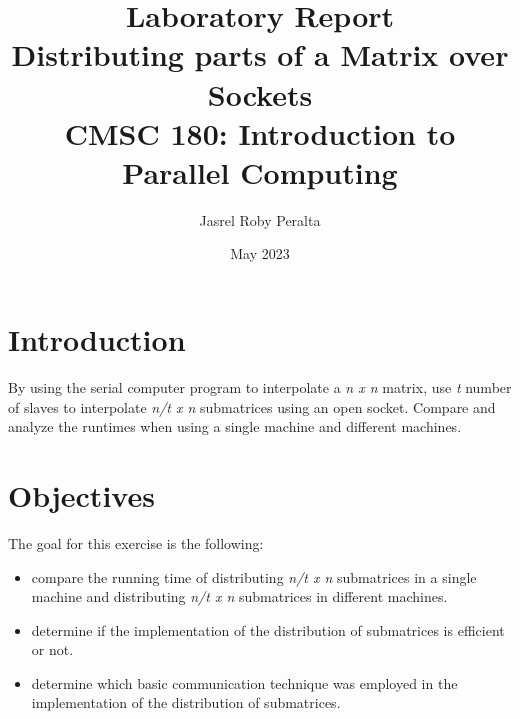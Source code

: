 \documentclass{article}
\title{
\textbf{Laboratory Report} \\
\huge Distributing parts of a Matrix over Sockets\\
\large CMSC 180: Introduction to Parallel Computing
}
\author{Jasrel Roby Peralta}
\date{May 2023}
\begin{document}
\maketitle

\section*{Introduction}
\hspace{\parindent} By using the serial computer program to interpolate a \emph{n x n} matrix, use \emph{t} number of slaves to interpolate \emph{n/t x n} submatrices using an open socket. Compare and analyze the runtimes when using a single machine and different machines.

\section*{Objectives}
The goal for this exercise is the following:
\begin{itemize}
    \item compare the running time of distributing \emph{n/t x n} submatrices in a single machine and distributing \emph{n/t x n} submatrices in different machines.
    \item determine if the implementation of the distribution of submatrices is efficient or not.
    \item determine which basic communication technique was employed in the implementation of the distribution of submatrices.
\end{itemize}
\end{document}
